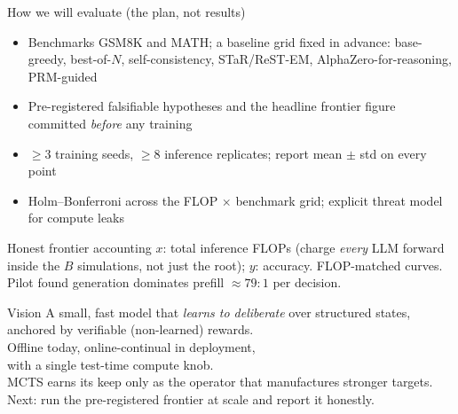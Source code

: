 \documentclass[aspectratio=169]{beamer}
\begin{document}
\begin{frame}{How we will evaluate (the plan, not results)}
  \begin{itemize}
    \item Benchmarks GSM8K and MATH; a baseline grid fixed in advance: base-greedy, best-of-$N$, self-consistency, STaR/ReST-EM, AlphaZero-for-reasoning, PRM-guided
    \item \alert{Pre-registered} falsifiable hypotheses and the headline frontier figure committed \emph{before} any training
    \item $\geq 3$ training seeds, $\geq 8$ inference replicates; report mean $\pm$ std on every point
    \item Holm--Bonferroni across the FLOP $\times$ benchmark grid; explicit threat model for compute leaks
  \end{itemize}
  \begin{block}{Honest frontier accounting}
    $x$: total inference FLOPs (charge \emph{every} LLM forward inside the $B$ simulations, not just the root); $y$: accuracy. FLOP-matched curves. Pilot found generation dominates prefill $\approx 79{:}1$ per decision.
  \end{block}
\end{frame}

\begin{frame}[standout]{Vision}
  A small, fast model that \emph{learns to deliberate} over structured states,\\
  anchored by verifiable (non-learned) rewards.\\[1em]
  Offline today, online-continual in deployment,\\ with a single test-time compute knob.\\[1em]
  \footnotesize MCTS earns its keep only as the operator that manufactures stronger targets.\\
  Next: run the pre-registered frontier at scale and report it honestly.
\end{frame}
\end{document}
